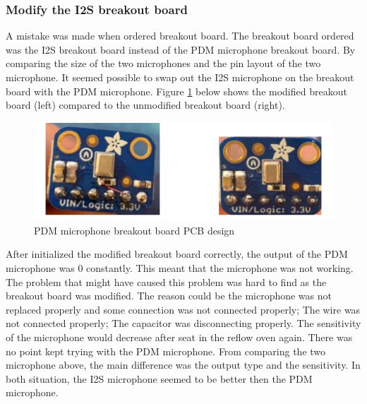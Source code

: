 \subsubsection{Modify the I2S breakout board}
A mistake was made when ordered breakout board. The breakout board ordered was the I2S breakout board instead of the PDM microphone breakout board. By comparing the size of the two microphones and the pin layout of the two microphone. It seemed possible to swap out the I2S microphone on the breakout board with the PDM microphone. Figure \ref{fig:modified} below shows the modified breakout board (left) compared to the unmodified breakout board (right). 
\begin{figure}[H]
	\centering
	\noindent\includegraphics[width=1\textwidth]{images/modified.png}
	\caption{PDM microphone breakout board PCB design}
	\label{fig:modified}
\end{figure}
After initialized the modified breakout board correctly, the output of the PDM microphone was 0 constantly. This meant that the microphone was not working. The problem that might have caused this problem was hard to find as the breakout board was modified. The reason could be the microphone was not replaced properly and some connection was not connected properly; The wire was not connected properly; The capacitor was disconnecting properly. The sensitivity of the microphone would decrease after seat in the reflow oven again. There was no point kept trying with the PDM microphone. From comparing the two microphone above, the main difference was the output type and the sensitivity. In both situation, the I2S microphone seemed to be better then the PDM microphone. 

